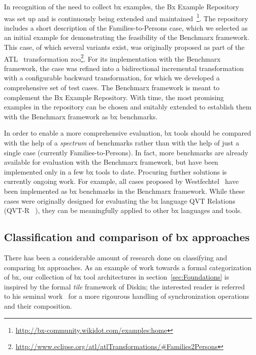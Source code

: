 In recognition of the need to collect bx examples, the Bx Example Repository~\cite{Cheney2014} was set up and is continuously being extended and maintained~\footnote{\url{http://bx-community.wikidot.com/examples:home}}.
The repository includes a short description of the Families-to-Persons case, which we selected as an initial example for demonstrating the feasibility of the Benchmarx framework.
This case, of which several variants exist, was originally proposed as part of the ATL~\cite{SCP-Jouault2008} transformation zoo\footnote{\url{http://www.eclipse.org/atl/atlTransformations/\#Families2Persons}}.
For its implementation with the Benchmarx framework, the case was refined into a bidirectional incremental transformation with a configurable backward transformation, for which we developed a comprehensive set of test cases.
The Benchmarx framework is meant to complement the Bx Example Repository.
With time, the most promising examples in the repository can be chosen and suitably extended to establish them with the Benchmarx framework as bx benchmarks.

In order to enable a more comprehensive evaluation, bx tools should be compared with the help of a \emph{spectrum} of benchmarks rather than with the help of just a single case (currently Families-to-Persons).
In fact, more benchmarks are already available for evaluation with the Benchmarx framework, but have been implemented only in a few bx tools to date.
Procuring further solutions is currently ongoing work.
For example, all cases proposed by Westfechtel~\cite{SoSym2018-Westfechtel} have been implemented as bx benchmarks in the Benchmarx framework.
While these cases were originally designed for evaluating the bx language QVT Relations (QVT-R ~\cite{QVT-1.3}), they can be meaningfully applied to other bx languages and tools.


\subsection{Classification and comparison of bx approaches}
\label{sec:ClassificationOfBxApproaches}

There has been a considerable amount of research done on classifying and comparing bx approaches.
As an example of work towards a formal categorization of bx, our collection of bx tool architectures in section~\ref{sec:Foundations} is inspired by the formal \emph{tile} framework of Diskin; the interested reader is referred to his seminal work~\cite{DBLP:conf/gttse/Diskin09} for a more rigourous handling of synchronization operations and their composition.

